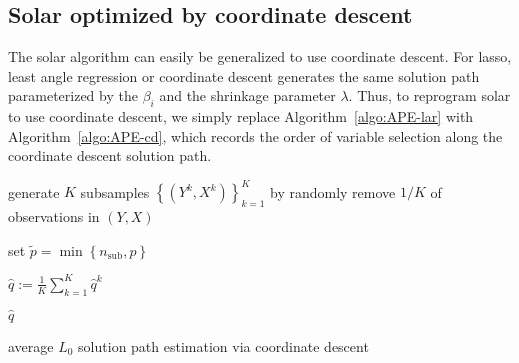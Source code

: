 \documentclass[11pt,review,authoryear]{elsarticle}
\begin{document}
\subsection{Solar optimized by coordinate descent}

The solar algorithm can easily be generalized to use coordinate descent. For lasso, least angle regression or coordinate descent generates the same solution path parameterized by the $\beta_i$ and the shrinkage parameter $\lambda$. Thus, to reprogram solar to use coordinate descent, we simply replace Algorithm~\ref{algo:APE-lar} with Algorithm~\ref{algo:APE-cd}, which records the order of variable selection along the coordinate descent solution path.

\smallskip
\begin{algorithm}[ht]


  \smallskip

  generate $K$ subsamples $\left\{ \left( Y^k, X^k \right) \right\}^{K}_{k=1}$ by randomly remove $1/K$ of observations in $\left( Y, X \right)$\;

  set $\widetilde{p} = \min\left\{ n_{\mathrm{sub}}, p \right\}$ \;


  $\widehat{q} := \frac{1}{K} \sum_{k=1}^{K} \widehat{q}^k$\; 

  \Return $\widehat{q}$

\caption{average $L_0$ solution path estimation via coordinate descent \label{algo:APE-cd}}

\end{algorithm}
\end{document}
